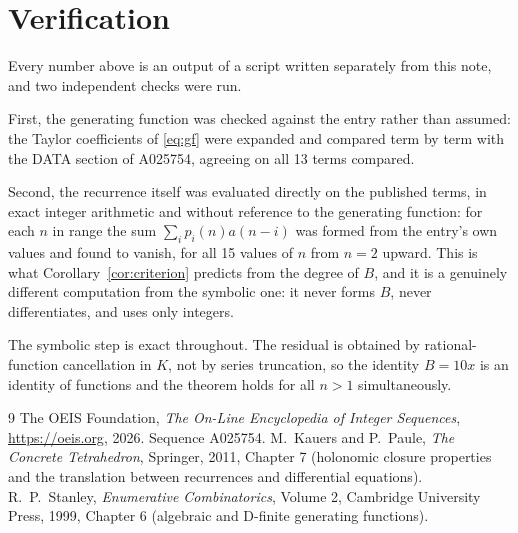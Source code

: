\documentclass[11pt,a4paper]{article}
\theoremstyle{plain}
\theoremstyle{definition}
\begin{document}
\section{Verification}

Every number above is an output of a script written separately from this note, and two
independent checks were run.

First, the generating function was checked against the entry rather than assumed: the
Taylor coefficients of \eqref{eq:gf} were expanded and compared term by term with the DATA
section of A025754, agreeing on all 13 terms compared.

Second, the recurrence itself was evaluated directly on the published terms, in exact
integer arithmetic and without reference to the generating function: for each $n$ in range
the sum $\sum_{i}p_{i}(n)a(n-i)$ was formed from the entry's own values and found to
vanish, for all 15 values of $n$ from $n=2$ upward. This is what
Corollary~\ref{cor:criterion} predicts from the degree of $B$, and it is a genuinely
different computation from the symbolic one: it never forms $B$, never differentiates, and
uses only integers.

The symbolic step is exact throughout. The residual is obtained by rational-function
cancellation in $K$, not by series truncation, so the identity $B=10 x$ is an
identity of functions and the theorem holds for all $n>1$ simultaneously.

\begin{thebibliography}{9}
 The OEIS Foundation, \emph{The On-Line Encyclopedia of Integer Sequences},
\url{https://oeis.org}, 2026. Sequence A025754.
 M.~Kauers and P.~Paule, \emph{The Concrete Tetrahedron}, Springer, 2011,
Chapter 7 (holonomic closure properties and the translation between recurrences and
differential equations).
 R.~P.~Stanley, \emph{Enumerative Combinatorics}, Volume 2, Cambridge
University Press, 1999, Chapter 6 (algebraic and D-finite generating functions).
\end{thebibliography}
\end{document}
